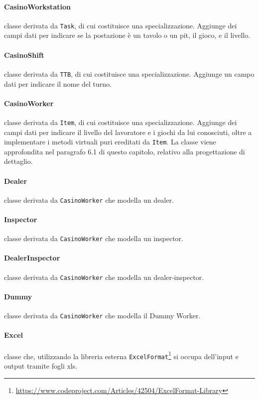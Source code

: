 \paragraph{CasinoWorkstation} classe derivata da \texttt{Task}, di cui costituisce una specializzazione. Aggiunge dei campi dati per indicare se la postazione è un tavolo o un pit, il gioco, e il livello.
\paragraph{CasinoShift} classe derivata da \texttt{TTB}, di cui costituisce una specializzazione. Aggiunge un campo dati per indicare il nome del turno.
\paragraph{CasinoWorker} classe derivata da \texttt{Item}, di cui costituisce una specializzazione. Aggiunge dei campi dati per indicare il livello del lavoratore e i giochi da lui conosciuti, oltre a implementare i metodi virtuali puri ereditati da \texttt{Item}. La classe viene approfondita nel paragrafo 6.1 di questo capitolo, relativo alla progettazione di dettaglio.
\paragraph{Dealer} classe derivata da \texttt{CasinoWorker} che modella un dealer.
\paragraph{Inspector} classe derivata da \texttt{CasinoWorker} che modella un inspector.
\paragraph{DealerInspector} classe derivata da \texttt{CasinoWorker} che modella un dealer-inspector.
\paragraph{Dummy} classe derivata da \texttt{CasinoWorker} che modella il Dummy Worker.
\paragraph{Excel} classe che, utilizzando la libreria esterna \texttt{ExcelFormat}\footnote{{\color{blue} \url{https://www.codeproject.com/Articles/42504/ExcelFormat-Library}}} si occupa dell'input e output tramite fogli xls.
